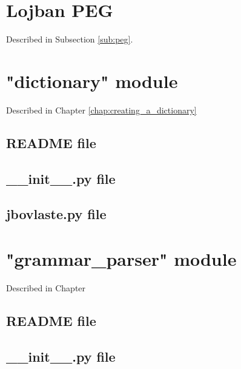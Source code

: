 \chapter{Lojban PEG}
\label{appendix:peg-annex}

Described in Subsection \ref{sub:peg}.



\chapter{"dictionary" module}
\label{appendix:jbovlaste-annex}

Described in Chapter \ref{chap:creating_a_dictionary}

\section{README file}



\section{\_\_init\_\_.py file}



\section{jbovlaste.py file}



\chapter{"grammar\_parser" module}
\label{appendix:gentufa-annex}

Described in Chapter %

\section{README file}



\section{\_\_init\_\_.py file}

